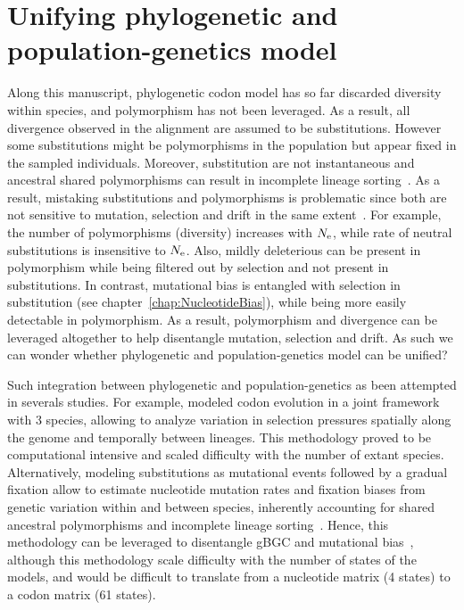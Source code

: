 \section{Unifying phylogenetic and population-genetics model}
\label{sec:unifying-phylogenetic-and-population-genetics-model}

Along this manuscript, phylogenetic codon model has so far discarded diversity within species, and polymorphism has not been leveraged.
As a result, all divergence observed in the alignment are assumed to be substitutions.
However some substitutions might be polymorphisms in the population but appear fixed in the sampled individuals.
Moreover, substitution are not instantaneous and ancestral shared polymorphisms can result in incomplete lineage sorting~\citep{Charlesworth2010}.
As a result, mistaking substitutions and polymorphisms is problematic since both are not sensitive to mutation, selection and drift in the same extent~\citep{Mugal2014}.
For example, the number of polymorphisms (diversity) increases with $N_{\textrm{e}}$, while rate of neutral substitutions is insensitive to $N_{\textrm{e}}$.
Also, mildly deleterious can be present in polymorphism while being filtered out by selection and not present in substitutions.
In contrast, mutational bias is entangled with selection in substitution (see chapter~\ref{chap:NucleotideBias}), while being more easily detectable in polymorphism.
As a result, polymorphism and divergence can be leveraged altogether to help disentangle mutation, selection and drift.
As such we can wonder whether phylogenetic and population-genetics model can be unified?

Such integration between phylogenetic and population-genetics as been attempted in severals studies.
For example, \citet{Wilson2011} modeled codon evolution in a joint framework with $3$ species, allowing to analyze variation in selection pressures spatially along the genome and temporally between lineages.
This methodology proved to be computational intensive and scaled difficulty with the number of extant species.
Alternatively, modeling substitutions as mutational events followed by a gradual fixation allow to estimate nucleotide mutation rates and fixation biases from genetic variation within and between species, inherently accounting for shared ancestral polymorphisms and incomplete lineage sorting~\citep{DeMaio2013, Schrempf2016, Bergman2018, Schrempf2019}.
Hence, this methodology can be leveraged to disentangle gBGC and mutational bias~\citep{Borges2019, Borges2020}, although this methodology scale difficulty with the number of states of the models, and would be difficult to translate from a nucleotide matrix (4 states) to a codon matrix (61 states).

